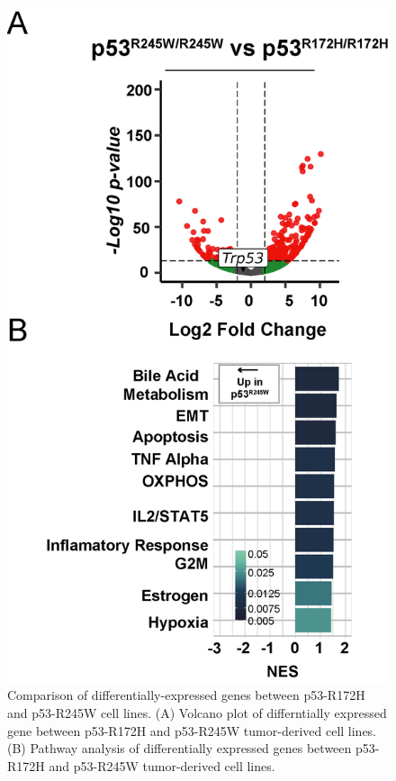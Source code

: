 \begin{figure}
\hypertarget{fig:04}{%
\centering
\includegraphics[width=1\textwidth,height=\textheight]{images/p5310.png}
\caption{Comparison of differentially-expressed genes between p53-R172H and p53-R245W cell lines. (A) Volcano plot of differntially expressed gene between p53-R172H and p53-R245W tumor-derived cell lines. (B) Pathway analysis of differentially expressed genes between p53-R172H and p53-R245W tumor-derived cell lines.}\label{fig:04}
}
\end{figure}

